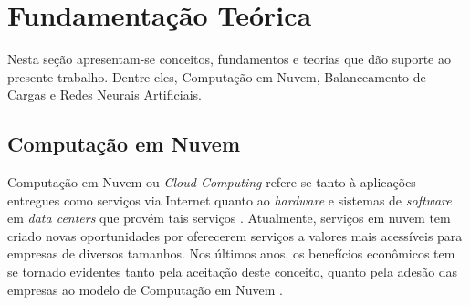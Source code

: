 \chapter{Fundamentação Teórica}\label{cap:fundamentacao-teorica}
Nesta seção apresentam-se conceitos, fundamentos e teorias que dão suporte ao presente trabalho. Dentre eles, Computação em Nuvem, Balanceamento de Cargas e Redes Neurais Artificiais.
\section{Computação em Nuvem}\label{sec:cloud-comp}
Computação em Nuvem ou \textit{Cloud Computing} refere-se tanto à aplicações entregues como serviços via Internet quanto ao \textit{hardware} e sistemas de \textit{software} em \textit{data centers} que provém tais serviços \cite{Armbrust:2010}. Atualmente, serviços em nuvem tem criado novas oportunidades por oferecerem serviços a valores mais acessíveis para empresas de diversos tamanhos. Nos últimos anos, os benefícios econômicos tem se tornado evidentes tanto pela aceitação deste conceito, quanto pela adesão das empresas ao modelo de Computação em Nuvem \cite{raza2015}.

